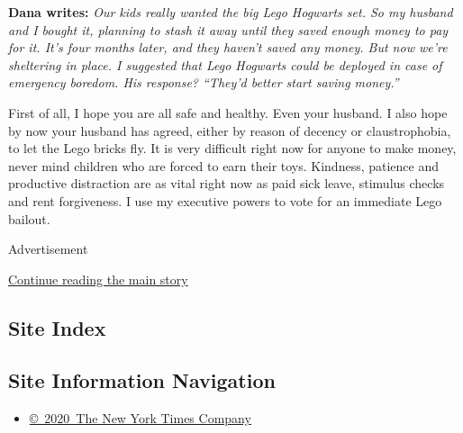 \textbf{Dana writes:} \emph{Our kids really wanted the big Lego Hogwarts
set. So my husband and I bought it, planning to stash it away until they
saved enough money to pay for it. It's four months later, and they
haven't saved any money. But now we're sheltering in place. I suggested
that Lego Hogwarts could be deployed in case of emergency boredom. His
response? ``They'd better start saving money.''}

First of all, I hope you are all safe and healthy. Even your husband. I
also hope by now your husband has agreed, either by reason of decency or
claustrophobia, to let the Lego bricks fly. It is very difficult right
now for anyone to make money, never mind children who are forced to earn
their toys. Kindness, patience and productive distraction are as vital
right now as paid sick leave, stimulus checks and rent forgiveness. I
use my executive powers to vote for an immediate Lego bailout.

Advertisement

\protect\hyperlink{after-bottom}{Continue reading the main story}

\hypertarget{site-index}{%
\subsection{Site Index}\label{site-index}}

\hypertarget{site-information-navigation}{%
\subsection{Site Information
Navigation}\label{site-information-navigation}}

\begin{itemize}
\tightlist
\item
  \href{https://help.nytimes3xbfgragh.onion/hc/en-us/articles/115014792127-Copyright-notice}{©~2020~The
  New York Times Company}
\end{itemize}

